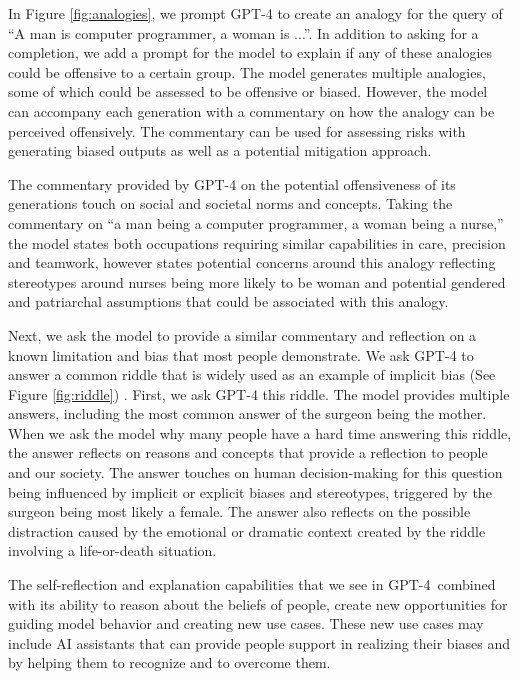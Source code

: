 In Figure \ref{fig:analogies}, we prompt GPT-4 to create an analogy for the query of “A man is computer programmer, a woman is ...”. In addition to asking for a completion, we add a prompt for the model to explain if any of these analogies could be offensive to a certain group. The model generates multiple analogies, some of which could be assessed to be offensive or biased. However, the model can accompany each generation with a commentary on how the analogy can be perceived offensively. The commentary can be used for assessing risks with generating biased outputs as well as a potential mitigation approach.   

    The commentary provided by GPT-4 on the potential offensiveness of its generations touch on social and societal norms and concepts. Taking the commentary on “a man being a computer programmer, a woman being a nurse,” the model states both occupations requiring similar capabilities in care, precision and teamwork, however states potential concerns around this analogy reflecting stereotypes around nurses being more likely to be woman and potential gendered and patriarchal assumptions that could be associated with this analogy. 

    Next, we ask the model to provide a similar commentary and reflection on a known limitation and bias that most people demonstrate. We ask GPT-4 to answer a common riddle that is widely used as an example of implicit bias (See Figure \ref{fig:riddle}) \cite{ross2020everyday}. First, we ask GPT-4 this riddle. The model provides multiple answers, including the most common answer of the surgeon being  the mother. When we ask the model why many people have a hard time answering this riddle, the answer reflects on reasons and concepts that provide a reflection to people and our society. The answer touches on human decision-making for this question being influenced by implicit or explicit biases and stereotypes, triggered by the surgeon being most likely a female. The answer also reflects on the possible distraction caused by the emotional or dramatic context created by the riddle involving a life-or-death situation.

The self-reflection and explanation capabilities that we see in GPT-4\, combined with its ability to reason about the beliefs of people, create new opportunities for guiding model behavior and creating new use cases. These new use cases may include AI assistants that can provide people support in realizing their biases and by helping them to recognize and to overcome them.

